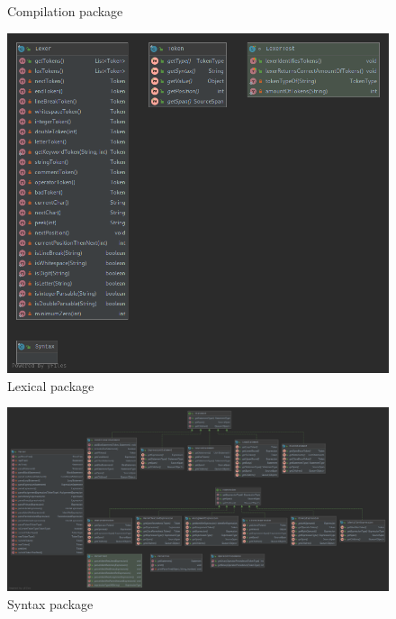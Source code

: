 \documentclass[
]{report}
\begin{document}
\begin{appendices}
\begin{figure}
		\caption{Compilation package}
		\label{fig:compilation-package-diagram}
	\end{figure}
	\begin{figure}
		\centering
		\includegraphics[width=\textwidth]{lexical-package-diagram}
		\caption{Lexical package}
		\label{fig:lexical-package-diagram}
	\end{figure}
	\begin{figure}
		\centering
		\includegraphics[width=\textwidth]{syntax-package-diagram}
		\caption{Syntax package}
		\label{fig:syntax-package-diagram}
	\end{figure}
	\begin{figure}
		\centering

\end{figure}
\end{appendices}
\end{document}
